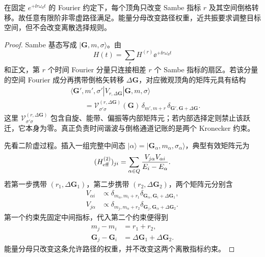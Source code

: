 \begin{lemma}
在固定 $e^{+\ii r\omega_dt}$ 的 Fourier 约定下，每个顶角只改变 Sambe 指标 $r$ 及其空间倒格转移。故任意有限阶非零虚路径满足。能量分母改变路径权重，近共振要求调整目标空间，但不会改变离散选择规则。
\end{lemma}
\begin{proof}
Sambe 基态写成 $|\mathbf G,m,\sigma\rangle$。由
\[
H(t)=\sum_r H^{(r)}\ee^{+\ii r\omega_d t}
\]
和正文，第 $r$ 个时间 Fourier 分量只连接相差 $r$ 个 Sambe 指标的扇区。若该分量的空间 Fourier 成分再携带倒格矢转移 $\Delta\mathbf G$，对应微观顶角的矩阵元具有结构
\begin{align*}
&\langle \mathbf G',m',\sigma'|
V_{r,\Delta\mathbf G}
|\mathbf G,m,\sigma\rangle\\
&\qquad=
\mathcal V^{(r,\Delta\mathbf G)}_{\sigma'\sigma}(\mathbf G)
\,\delta_{m',m+r}
\,\delta_{\mathbf G',\mathbf G+\Delta\mathbf G}.
\end{align*}
这里 $\mathcal V^{(r,\Delta\mathbf G)}_{\sigma'\sigma}$ 包含自旋、能带、偏振等内部矩阵元；若内部选择定则禁止该跃迁，它本身为零。真正负责时间谐波与倒格通道记账的是两个 Kronecker 约束。

先看二阶虚过程。插入一组完整中间态 $|\alpha\rangle=|\mathbf G_\alpha,m_\alpha,\sigma_\alpha\rangle$，典型有效矩阵元为
\[
( H_{\rm eff}^{(2)} )_{ji}
=\sum_{\alpha\in Q}
\frac{V_{j\alpha}V_{\alpha i}}
{E_i-E_\alpha}.
\]
若第一步携带 $(r_1,\Delta\mathbf G_1)$，第二步携带 $(r_2,\Delta\mathbf G_2)$，两个矩阵元分别含
\begin{align*}
V_{\alpha i}&\propto
\delta_{m_\alpha,m_i+r_1}
\delta_{\mathbf G_\alpha,\mathbf G_i+\Delta\mathbf G_1},\\
V_{j\alpha}&\propto
\delta_{m_j,m_\alpha+r_2}
\delta_{\mathbf G_j,\mathbf G_\alpha+\Delta\mathbf G_2}.
\end{align*}
第一个约束先固定中间指标，代入第二个约束便得到
\begin{align*}
m_j-m_i&=r_1+r_2,\\
\mathbf G_j-\mathbf G_i
&=\Delta\mathbf G_1+\Delta\mathbf G_2.
\end{align*}
能量分母只改变这条允许路径的权重，并不改变这两个离散指标约束。


\end{proof}
